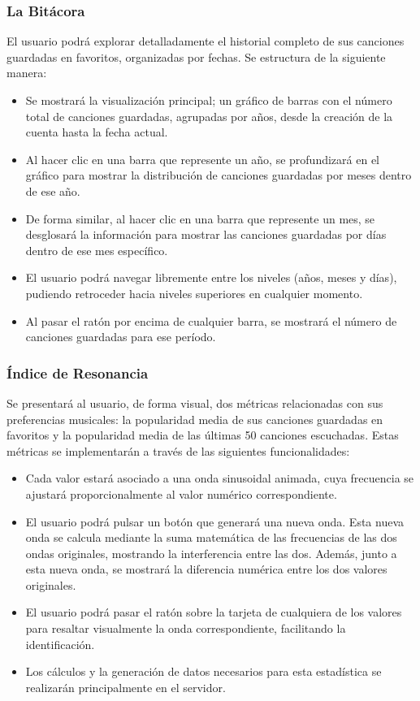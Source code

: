 \subsubsection*{La Bitácora}

El usuario podrá explorar detalladamente el historial completo de sus canciones guardadas en favoritos, organizadas por fechas. Se estructura de la siguiente manera:
\begin{itemize}
    \item Se mostrará la visualización principal; un gráfico de barras con el número total de canciones guardadas, agrupadas por años, desde la creación de la cuenta hasta la fecha actual.
    \item Al hacer clic en una barra que represente un año, se profundizará en el gráfico para mostrar la distribución de canciones guardadas por meses dentro de ese año.
    \item De forma similar, al hacer clic en una barra que represente un mes, se desglosará la información para mostrar las canciones guardadas por días dentro de ese mes específico.
    \item El usuario podrá navegar libremente entre los niveles (años, meses y días), pudiendo retroceder hacia niveles superiores en cualquier momento.
    \item Al pasar el ratón por encima de cualquier barra, se mostrará el número de canciones guardadas para ese período.
\end{itemize}


\subsubsection*{Índice de Resonancia}

Se presentará al usuario, de forma visual, dos métricas relacionadas con sus preferencias musicales: la popularidad media de sus canciones guardadas en favoritos y la popularidad media de las últimas 50 canciones escuchadas. Estas métricas se implementarán a través de las siguientes funcionalidades:
\begin{itemize}
    \item Cada valor estará asociado a una onda sinusoidal animada, cuya frecuencia se ajustará proporcionalmente al valor numérico correspondiente.
    \item El usuario podrá pulsar un botón que generará una nueva onda. Esta nueva onda se calcula mediante la suma matemática de las frecuencias de las dos ondas originales, mostrando la interferencia entre las dos. Además, junto a esta nueva onda, se mostrará la diferencia numérica entre los dos valores originales.
    \item El usuario podrá pasar el ratón sobre la tarjeta de cualquiera de los valores para resaltar visualmente la onda correspondiente, facilitando la identificación.
    \item Los cálculos y la generación de datos necesarios para esta estadística se realizarán principalmente en el servidor.
\end{itemize}

